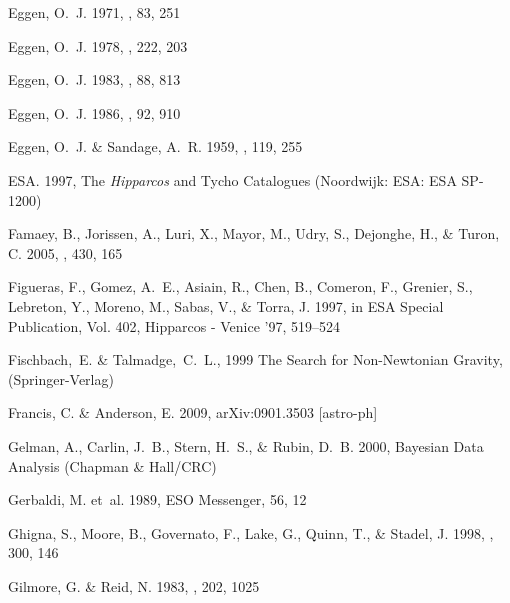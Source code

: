 \begin{thebibliography}{99}
{Eggen}, O.~J. 1971{}, \pasp, 83, 251

{Eggen}, O.~J. 1978, \apj, 222, 203

{Eggen}, O.~J. 1983, \aj, 88, 813

{Eggen}, O.~J. 1986, \aj, 92, 910

{Eggen}, O.~J. \& {Sandage}, A.~R. 1959, \mnras, 119, 255

{ESA}. 1997, {The \emph{Hipparcos} and Tycho Catalogues} (Noordwijk: ESA: {ESA
  SP-1200})

{Famaey}, B., {Jorissen}, A., {Luri}, X., {Mayor}, M., {Udry}, S., {Dejonghe},
  H., \& {Turon}, C. 2005, \aap, 430, 165

{Figueras}, F., {Gomez}, A.~E., {Asiain}, R., {Chen}, B., {Comeron}, F.,
  {Grenier}, S., {Lebreton}, Y., {Moreno}, M., {Sabas}, V., \& {Torra}, J.
  1997, in ESA Special Publication, Vol. 402, Hipparcos - Venice '97, 519--524

  Fischbach,~E. \& Talmadge,~C.~L., 1999
  The Search for Non-Newtonian Gravity,
  (Springer-Verlag)

{Francis}, C. \& {Anderson}, E. 2009, arXiv:0901.3503 [astro-ph]

{Gelman}, A., {Carlin}, J.~B., {Stern}, H.~S., \& {Rubin}, D.~B. 2000,
  {Bayesian Data Analysis} ({Chapman \& Hall/CRC})

{Gerbaldi}, M. {et~al.} 1989, ESO Messenger, 56, 12

{Ghigna}, S., {Moore}, B., {Governato}, F., {Lake}, G., {Quinn}, T., \&
  {Stadel}, J. 1998, \mnras, 300, 146

{Gilmore}, G. \& {Reid}, N. 1983, \mnras, 202, 1025


\end{thebibliography}
